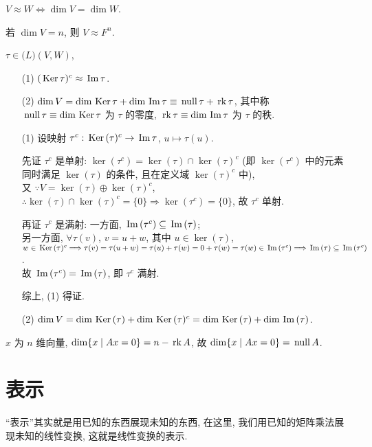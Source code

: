 \documentclass{note}
\begin{document}
\begin{thm}[(课本定理 2.6)]
    $V\approx W\Longleftrightarrow\dim V=\dim W$.
\end{thm}

\begin{thm}[(课本定理 2.7)]
    若 $\dim V=n$, 则 $V\approx F^n$.
\end{thm}

\begin{thm}[(课本定理 2.8)]
    $\tau\in\mathcal(L)(V,W)$,
    \begin{itemize}
        \item[(1)] $(\,\mathrm{Ker}\,\tau)^c\approx\,\mathrm{Im}\,\tau$.
        \item[(2)] $\dim V=\dim\,\mathrm{Ker}\,\tau+\dim\,\mathrm{Im}\,\tau\equiv\,\mathrm{null}\,\tau+\,\mathrm{rk}\,\tau$, 其中称 $\,\mathrm{null}\,\tau\equiv\dim\,\mathrm{Ker}\,\tau$ 为 $\tau$ 的零度, $\,\mathrm{rk}\,\tau\equiv\dim\,\mathrm{Im}\,\tau$ 为 $\tau$ 的秩.
    \end{itemize}
\end{thm}
\begin{pf}
    \begin{itemize}
        \item[(1)] 设映射 $\tau^c:\,\mathrm{Ker}\,(\tau)^c\rightarrow\,\mathrm{Im}\,\tau$, $u\mapsto\tau(u)$.

        先证 $\tau^c$ 是单射: $\ker(\tau^c)=\ker(\tau)\cap\ker(\tau)^c$ (即 $\ker(\tau^c)$ 中的元素同时满足 $\ker(\tau)$ 的条件, 且在定义域 $\ker(\tau)^c$ 中),\\
        又 $\because V=\ker(\tau)\oplus\ker(\tau)^c$, $\therefore\ker(\tau)\cap\ker(\tau)^c=\{0\}\Longrightarrow\ker(\tau^c)=\{0\}$, 故 $\tau^c$ 单射.

        再证 $\tau^c$ 是满射: 一方面, $\,\mathrm{Im}\,(\tau^c)\subseteq\,\mathrm{Im}\,(\tau)$;\\
        另一方面, $\forall\tau(v)$, $v=u+w$, 其中 $u\in\ker(\tau)$, $w\in\,\mathrm{Ker}\,(\tau)^c\Longrightarrow\tau(v)=\tau(u+w)=\tau(u)+\tau(w)=0+\tau(w)=\tau(w)\in\,\mathrm{Im}\,(\tau^c)\Longrightarrow\,\mathrm{Im}\,(\tau)\subseteq\,\mathrm{Im}\,(\tau^c)$.\\
        故 $\,\mathrm{Im}\,(\tau^c)=\,\mathrm{Im}\,(\tau)$, 即 $\tau^c$ 满射.

        综上, (1) 得证.
        \item[(2)] $\dim V=\dim\,\mathrm{Ker}\,(\tau)+\dim\,\mathrm{Ker}\,(\tau)^c=\dim\,\mathrm{Ker}\,(\tau)+\dim\,\mathrm{Im}\,(\tau)$.
    \end{itemize}
\end{pf}

$x$ 为 $n$ 维向量, $\dim\{x\mid Ax=0\}=n-\,\mathrm{rk}\, A$, 故 $\dim\{x\mid Ax=0\}=\,\mathrm{null}\, A$.

\section{表示}
``表示''其实就是用已知的东西展现未知的东西, 在这里, 我们用已知的矩阵乘法展现未知的线性变换, 这就是线性变换的表示.
\end{document}
